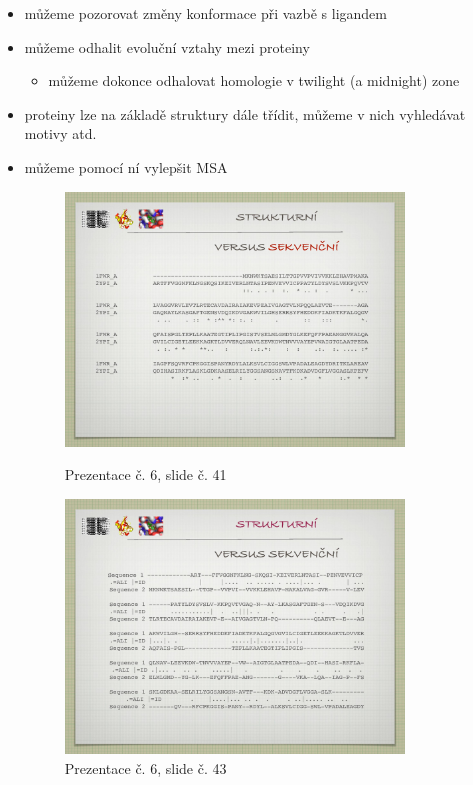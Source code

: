 \documentclass[DIV=8]{scrreprt}
\begin{document}
\begin{itemize}[nosep]
    \item můžeme pozorovat změny konformace při vazbě s ligandem
    \item můžeme odhalit evoluční vztahy mezi proteiny
\begin{itemize}[nosep]
    \item můžeme dokonce odhalovat homologie v twilight (a midnight) zone
\end{itemize}

    \item proteiny lze na základě struktury dále třídit, můžeme v nich vyhledávat motivy atd.
    \item můžeme pomocí ní vylepšit MSA \begin{figure}
    \caption{Prezentace č. 6, slide č. 41}
    \includegraphics[width=0.85\textwidth]{slides-6/slide-41.jpg}
    \centering
    \label{slides-6-slide-41}
\end{figure}
\begin{figure}
    \caption{Prezentace č. 6, slide č. 43}
    \includegraphics[width=0.85\textwidth]{slides-6/slide-43.jpg}

\end{figure}
\end{itemize}
\end{document}
